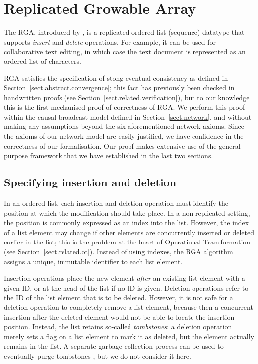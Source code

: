 \section{Replicated Growable Array}
\label{sect.rga}

The RGA, introduced by \citet{Roh:2011dw}, is a replicated ordered list (sequence) datatype that supports \emph{insert} and \emph{delete} operations.
For example, it can be used for collaborative text editing, in which case the text document is represented as an ordered list of characters.

RGA satisfies the specification of stong eventual consistency as defined in Section~\ref{sect.abstract.convergence}; this fact has previously been checked in handwritten proofs (see Section~\ref{sect.related.verification}), but to our knowledge this is the first mechanised proof of correctness of RGA.
We perform this proof within the causal broadcast model defined in Section~\ref{sect.network}, and without making any assumptions beyond the six aforementioned network axioms.
Since the axioms of our network model are easily justified, we have confidence in the correctness of our formalisation.
Our proof makes extensive use of the general-purpose framework that we have established in the last two sections.

\subsection{Specifying insertion and deletion}\label{sect.rga.spec}

In an ordered list, each insertion and deletion operation must identify the position at which the modification should take place.
In a non-replicated setting, the position is commonly expressed as an index into the list.
However, the index of a list element may change if other elements are concurrently inserted or deleted earlier in the list; this is the problem at the heart of Operational Transformation (see Section~\ref{sect.related.ot}).
Instead of using indexes, the RGA algorithm assigns a unique, immutable identifier to each list element.

Insertion operations place the new element \emph{after} an existing list element with a given ID, or at the head of the list if no ID is given.
Deletion operations refer to the ID of the list element that is to be deleted.
However, it is not safe for a deletion operation to completely remove a list element, because then a concurrent insertion after the deleted element would not be able to locate the insertion position.
Instead, the list retains so-called \emph{tombstones}: a deletion operation merely sets a flag on a list element to mark it as deleted, but the element actually remains in the list.
A separate garbage collection process can be used to eventually purge tombstones \cite{Roh:2011dw}, but we do not consider it here.

